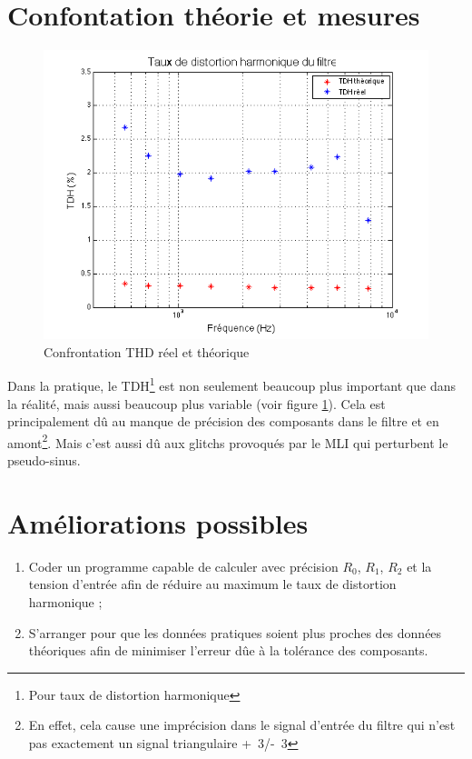 \section{Confontation théorie et mesures}

\begin{figure}[ht]
	\centering
	\includegraphics[scale=0.3]{img-filter/THD.png}
	\caption{Confrontation THD réel et théorique}
	\label{fig:thd-filtre}
\end{figure}

Dans la pratique, le TDH\footnote{Pour taux de distortion harmonique} 
est non seulement beaucoup plus important que dans la réalité, mais aussi beaucoup plus 
variable (voir figure \ref{fig:thd-filtre}). Cela est principalement dû au manque de précision des composants dans le filtre
et en amont\footnote{En effet, cela cause une imprécision dans le signal d'entrée du filtre
qui n'est pas exactement un signal triangulaire \unit{+3}{\volt}/\unit{-3}{\volt}}. Mais c'est
aussi dû aux glitchs provoqués par le MLI qui perturbent le pseudo-sinus.

\section{Améliorations possibles}

\begin{enumerate}
	\item Coder un programme capable de calculer avec précision $R_0$, $R_1$, $R_2$ et la tension 
				d'entrée afin de réduire au maximum le taux de distortion harmonique ;
	\item S'arranger pour que les données pratiques soient plus proches des données théoriques afin 
				de minimiser l'erreur dûe à la tolérance des composants.
\end{enumerate}

